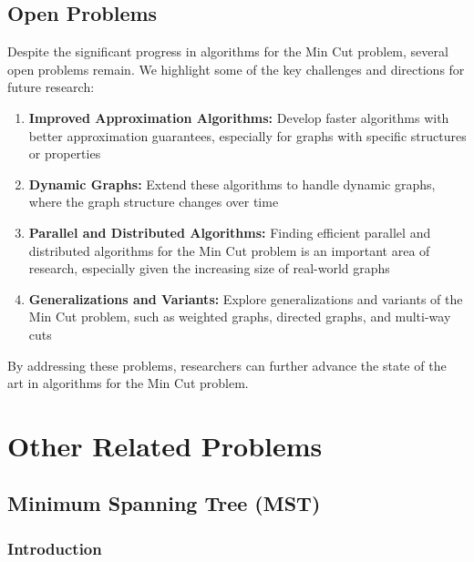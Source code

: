 \documentclass[11pt]{article}
\theoremstyle{plain}
\begin{document}

\subsection{Open Problems}

Despite the significant progress in algorithms for the Min Cut problem, several open problems remain. We highlight some of the key challenges and directions for future research:
\begin{enumerate}
    \item \textbf{Improved Approximation Algorithms:} Develop faster algorithms with better approximation guarantees, especially for graphs with specific structures or properties
    \item \textbf{Dynamic Graphs:} Extend these algorithms to handle dynamic graphs, where the graph structure changes over time
    \item \textbf{Parallel and Distributed Algorithms:} Finding efficient parallel and distributed algorithms for the Min Cut problem is an important area of research, especially given the increasing size of real-world graphs
    \item \textbf{Generalizations and Variants:} Explore generalizations and variants of the Min Cut problem, such as weighted graphs, directed graphs, and multi-way cuts
\end{enumerate}

By addressing these problems, researchers can further advance the state of the art in algorithms for the Min Cut problem.

\section{Other Related Problems}

\subsection{Minimum Spanning Tree (MST)}

\subsubsection{Introduction}
\end{document}
